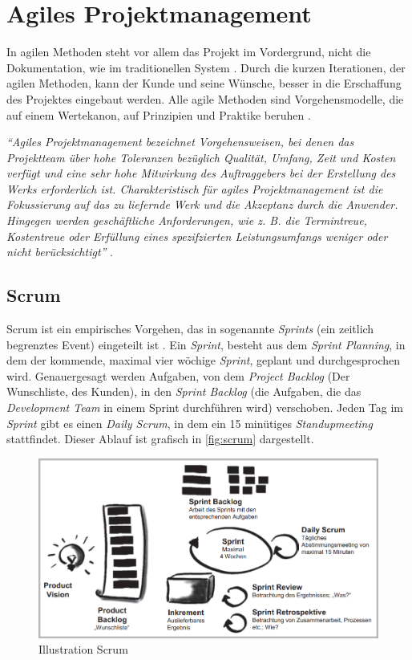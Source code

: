 \section{Agiles Projektmanagement}
\label{chapter:agil-pm}
In agilen Methoden steht vor allem das Projekt im Vordergrund, nicht die Dokumentation, wie im traditionellen System \cite{pm-agil-ursula}. Durch die kurzen Iterationen, der agilen Methoden, kann der Kunde und seine Wünsche, besser in die Erschaffung des Projektes eingebaut werden. Alle agile Methoden sind Vorgehensmodelle, die auf einem Wertekanon, auf Prinzipien und Praktike beruhen \cite{pm-agil-ursula}. 
\begin{center}
	\textit{\enquote{Agiles Projektmanagement bezeichnet Vorgehensweisen, 
			bei denen das Projektteam über hohe Toleranzen bezüglich Qualität, Umfang, Zeit und Kosten verfügt und eine sehr hohe Mitwirkung des Auftraggebers bei der Erstellung des Werks erforderlich ist. Charakteristisch für agiles Projektmanagement ist die Fokussierung auf das zu liefernde Werk und die Akzeptanz durch die Anwender. Hingegen werden geschäftliche Anforderungen, wie z. B. die Termintreue, Kostentreue oder Erfüllung eines spezifzierten Leistungsumfangs weniger oder nicht berücksichtigt}}  \cite{pm-agil-magazin}.
\end{center}
\subsection{Scrum}
Scrum ist ein empirisches Vorgehen, das in sogenannte \textit{Sprints} (ein zeitlich begrenztes Event) eingeteilt ist \cite{pm-agil-ursula}. Ein \textit{Sprint}, besteht aus dem \textit{Sprint Planning}, in dem der kommende, maximal vier wöchige \textit{Sprint}, geplant und durchgesprochen wird. Genauergesagt werden Aufgaben, von dem \textit{Project Backlog} (Der Wunschliste, des Kunden), in den \textit{Sprint Backlog} (die Aufgaben, die das \textit{Development Team} in einem Sprint durchführen wird) verschoben. Jeden Tag im \textit{Sprint} gibt es einen \textit{Daily Scrum}, in dem ein 15 minütiges \textit{Standupmeeting} stattfindet. Dieser Ablauf ist grafisch in \autoref{fig:scrum} dargestellt.
\begin{figure}[H]
	\centering
	\includegraphics[width=0.6\linewidth]{images/projektmanagement/scrum2}
	\caption[Scrum]{Illustration Scrum \cite{pm-agil-ursula}}
	\label{fig:scrum}
\end{figure}
